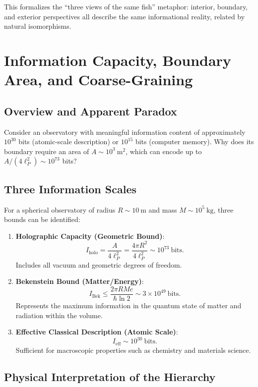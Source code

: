 ﻿\documentclass[12pt]{article}
\begin{document}
This formalizes the ``three views of the same fish'' metaphor: interior, boundary, and exterior perspectives all describe the same informational reality, related by natural isomorphisms.


\section{Information Capacity, Boundary Area, and Coarse-Graining}


\subsection{Overview and Apparent Paradox}


Consider an observatory with meaningful information content of approximately $10^{30}$ bits (atomic-scale description) or $10^{15}$ bits (computer memory). Why does its boundary require an area of $A \sim 10^3~\mathrm{m^2}$, which can encode up to $A/(4\ell_P^2) \sim 10^{73}$ bits?


\subsection{Three Information Scales}


For a spherical observatory of radius $R \sim 10~\mathrm{m}$ and mass $M \sim 10^5~\mathrm{kg}$, three bounds can be identified:


\begin{enumerate}
    \item \textbf{Holographic Capacity (Geometric Bound)}:
    \[
    I_{\mathrm{holo}} = \frac{A}{4\ell_P^2} = \frac{4 \pi R^2}{4 \ell_P^2} \sim 10^{73}~\text{bits}.
    \]
    Includes all vacuum and geometric degrees of freedom.


    \item \textbf{Bekenstein Bound (Matter/Energy)}:
    \[
    I_{\mathrm{Bek}} \le \frac{2\pi R M c}{\hbar \ln 2} \sim 3 \times 10^{49}~\text{bits}.
    \]
    Represents the maximum information in the quantum state of matter and radiation within the volume.


    \item \textbf{Effective Classical Description (Atomic Scale)}:
    \[
    I_{\mathrm{eff}} \sim 10^{30}~\text{bits}.
    \]
    Sufficient for macroscopic properties such as chemistry and materials science.
\end{enumerate}


\subsection{Physical Interpretation of the Hierarchy}
\end{document}
